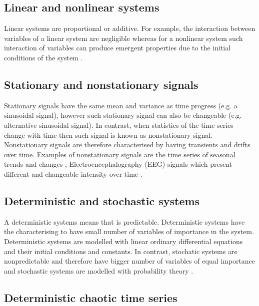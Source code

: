\subsection{Linear and nonlinear systems}
Linear systems are proportional or additive. For example, the interaction 
between variables of a linear system are negligible whereas for a nonlinear 
system such interaction of variables can produce emergent properties 
due to the initial conditions of the system \citep{klonowski2007}.

\subsection{Stationary and nonstationary signals}
Stationary signals have the same mean and variance as time progress (e.g. 
a sinusoidal signal), however such stationary signal can also be changeable
(e.g. alternative sinusoidal signal).
In contrast, when statistics of the time series change with time then 
such signal is known as nonstationary signal.
Nonstationary signals are therefore characterised by having transients and 
drifts over time. Examples of nonstationary signals are the time series of 
seasonal trends and changes \citep{kitagawa1984}, Electroencephalography (EEG) 
signals which present different and changeable intensity over time 
\citep{klonowski2007}.

\subsection{Deterministic and stochastic systems}
A deterministic systems means that is predictable. Deterministic systems 
have the characterising to have small number of variables of importance 
in the system. Deterministic systems are modelled with linear ordinary 
differential equations and their initial conditions and constants.
In contrast, stochatic systems are nonpredictable and therefore have 
bigger number of variables of equal importance and stochastic systems are 
modelled with probability theory \citep{klonowski2007}.

\subsection{Deterministic chaotic time series}

